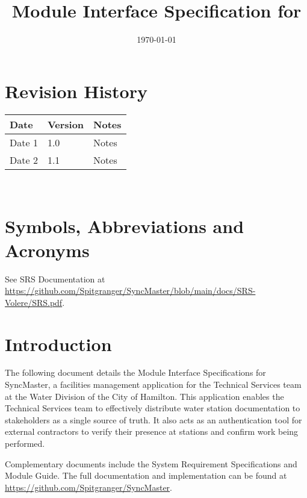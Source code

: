 \documentclass[12pt, titlepage]{article}
\begin{document}
\title{Module Interface Specification for \progname{}}

\author{\authname}

\date{\today}

\maketitle


\section{Revision History}

\begin{tabularx}{\textwidth}{p{3cm}p{2cm}X}
  \toprule {\bf Date} & {\bf Version} & {\bf Notes}\\
  \midrule
  Date 1 & 1.0 & Notes\\
  Date 2 & 1.1 & Notes\\
  \bottomrule
\end{tabularx}

~\newpage

\section{Symbols, Abbreviations and Acronyms}

See SRS Documentation at
\url{https://github.com/Spitgranger/SyncMaster/blob/main/docs/SRS-Volere/SRS.pdf}.

\newpage

\tableofcontents

\newpage


\section{Introduction}

The following document details the Module Interface Specifications for
SyncMaster, a facilities management application for the Technical
Services team at the Water Division of the City of Hamilton.
This application enables the Technical Services team to effectively distribute
water station documentation to stakeholders as a single source of
truth. It also acts as an authentication tool for external
contractors to verify their presence at stations and confirm work
being performed.

Complementary documents include the System Requirement Specifications
and Module Guide.  The full documentation and implementation can be
found at \url{https://github.com/Spitgranger/SyncMaster}.
\end{document}
